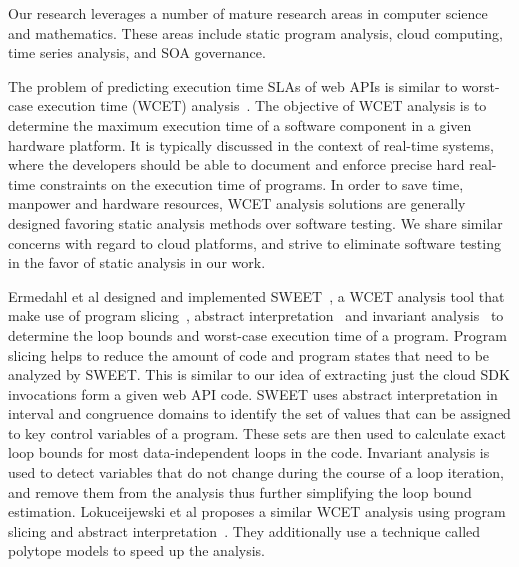 Our research leverages a number of mature research areas in computer 
science and mathematics. These areas include static program analysis, 
cloud computing, time series analysis,
and SOA governance.

The problem of predicting execution time SLAs of web APIs 
is similar to worst-case execution
time (WCET) analysis~\cite{Wilhelm:2008:WEP:1347375.1347389,ermedahl2007loop,Sandberg:2006:FWF:1134650.1134666,Muchnick:1998:ACD:286076,Frost:2011:WAJ:2043910.2043916}. 
The objective of WCET analysis is to determine the maximum execution time of a software component in a given hardware platform. It is 
typically discussed in the context of real-time systems, where the developers should be able to document
and enforce precise hard real-time constraints on the execution time of programs. In order to save time, 
manpower and hardware resources, WCET analysis solutions are generally designed favoring static
analysis methods over software testing. We share similar concerns with regard to cloud platforms,
and strive to eliminate software testing in the favor of static analysis in our work. 

Ermedahl et al designed and implemented SWEET~\cite{ermedahl2007loop}, a WCET analysis tool that make use of program slicing~\cite{Sandberg:2006:FWF:1134650.1134666},
 abstract interpretation~\cite{Cousot:1977:AIU:512950.512973} and invariant analysis~\cite{Muchnick:1998:ACD:286076} to determine the loop bounds and worst-case execution time 
 of a program. Program slicing helps to reduce the amount of code and program states that need to be 
 analyzed by SWEET. This is similar to our idea of extracting just the cloud SDK invocations form 
 a given web API code. SWEET uses abstract interpretation in interval and congruence domains to identify
 the set of values that can be assigned to key control variables of a program. These sets are then
 used to calculate exact loop bounds for most data-independent loops in the code. Invariant analysis  is
 used to detect variables that do not change during the course of a loop iteration, and remove them from
 the analysis thus further simplifying the loop bound estimation. Lokuceijewski et al proposes 
 a similar WCET analysis using program slicing and abstract interpretation~\cite{Lokuciejewski:2009:FPS:1545006.1545064}. They additionally use a technique
called polytope models to speed up the analysis.  
 
